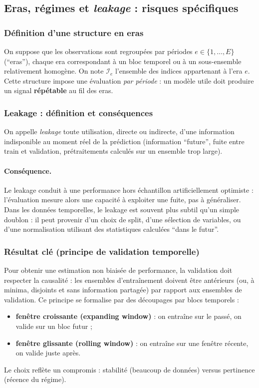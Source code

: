 \documentclass[11pt,a4paper]{article}
\newcommand{\1}{\mathbf{1}}
\begin{document}
\subsection{Eras, r\'egimes et \emph{leakage} : risques sp\'ecifiques}

\subsubsection{D\'efinition d'une structure en eras}
On suppose que les observations sont regroup\'ees par p\'eriodes $e\in\{1,\dots,E\}$ (``eras''), chaque era correspondant \`a un bloc temporel
ou \`a un sous-ensemble relativement homog\`ene. On note $\mathcal{I}_e$ l'ensemble des indices appartenant \`a l'era $e$.
Cette structure impose une \'evaluation \emph{par p\'eriode} : un mod\`ele utile doit produire un signal \textbf{r\'ep\'etable} au fil des eras.

\subsubsection{Leakage : d\'efinition et cons\'equences}
On appelle \emph{leakage} toute utilisation, directe ou indirecte, d'une information indisponible au moment r\'eel de la pr\'ediction
(information ``future'', fuite entre train et validation, pr\'etraitements calcul\'es sur un ensemble trop large).

\paragraph{Cons\'equence.}
Le leakage conduit \`a une performance hors \'echantillon artificiellement optimiste : l'\'evaluation mesure alors une capacit\'e \`a exploiter une fuite,
pas \`a g\'en\'eraliser. Dans les donn\'ees temporelles, le leakage est souvent plus subtil qu'un simple doublon : il peut provenir d'un choix de split,
d'une s\'election de variables, ou d'une normalisation utilisant des statistiques calcul\'ees ``dans le futur''.

\subsubsection{R\'esultat cl\'e (principe de validation temporelle)}
Pour obtenir une estimation non biais\'ee de performance, la validation doit respecter la causalit\'e : les ensembles d'entra\^{i}nement doivent \^etre
ant\'erieurs (ou, \`a minima, disjoints et sans information partag\'ee) par rapport aux ensembles de validation. Ce principe se formalise par des d\'ecoupages
par blocs temporels :
\begin{itemize}
  \item \textbf{fen\^etre croissante (expanding window)} : on entra\^{i}ne sur le pass\'e, on valide sur un bloc futur ;
  \item \textbf{fen\^etre glissante (rolling window)} : on entra\^{i}ne sur une fen\^etre r\'ecente, on valide juste apr\`es.
\end{itemize}
Le choix refl\`ete un compromis : stabilit\'e (beaucoup de donn\'ees) versus pertinence (r\'ecence du r\'egime).
\end{document}
